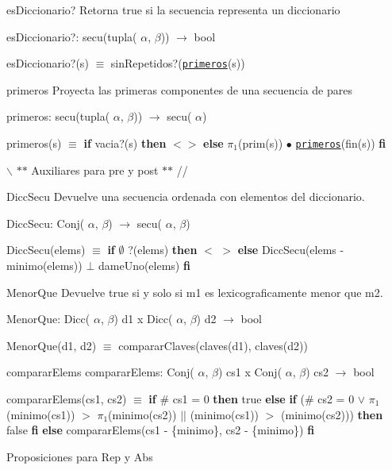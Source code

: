 \begin{DoxyParagraph}{es\-Diccionario?}
\-Retorna true si la secuencia representa un diccionario
\end{DoxyParagraph}
es\-Diccionario?\-: secu(tupla( $\alpha$, $\beta$)) $\to$ bool\par
 es\-Diccionario?(s) $\equiv$ sin\-Repetidos?(\href{axiomas.html#primeros}{\tt primeros}(s)) 

\begin{DoxyParagraph}{primeros}
\-Proyecta las primeras componentes de una secuencia de pares
\end{DoxyParagraph}
primeros\-: secu(tupla( $\alpha$, $\beta$)) $\to$ secu( $\alpha$)\par
 primeros(s) $\equiv$ {\bfseries if} vacia?(s) {\bfseries then} $<$$>$ {\bfseries else} $\pi_1$(prim(s)) $\bullet$ \href{axiomas.html#primeros}{\tt primeros}(fin(s)) {\bfseries fi} 

$\backslash$ $\ast$$\ast$ \-Auxiliares para pre y post $\ast$$\ast$ // \begin{DoxyParagraph}{\-Dicc\-Secu}
\-Devuelve una secuencia ordenada con elementos del diccionario.
\end{DoxyParagraph}
\-Dicc\-Secu\-: \-Conj( $\alpha$, $\beta$) $\to$ secu( $\alpha$, $\beta$)\par
 \-Dicc\-Secu(elems) $\equiv$ {\bfseries if} $\emptyset$ ?(elems) {\bfseries then} $<$ $>$ {\bfseries else} \-Dicc\-Secu(elems -\/ minimo(elems)) $\bot$ dame\-Uno(elems) {\bfseries fi} 

\begin{DoxyParagraph}{\-Menor\-Que}
\-Devuelve true si y solo si m1 es lexicograficamente menor que m2.
\end{DoxyParagraph}
\-Menor\-Que\-: \-Dicc( $\alpha$, $\beta$) d1 x \-Dicc( $\alpha$, $\beta$) d2 $\to$ bool\par
 \-Menor\-Que(d1, d2) $\equiv$ comparar\-Claves(claves(d1), claves(d2)) 

\begin{DoxyParagraph}{comparar\-Elems}
comparar\-Elems\-: \-Conj( $\alpha$, $\beta$) cs1 x \-Conj( $\alpha$, $\beta$) cs2 $\to$ bool\par
 comparar\-Elems(cs1, cs2) $\equiv$ {\bfseries if} \# cs1 = 0 {\bfseries then} true {\bfseries else} {\bfseries if} (\# cs2 = 0 $\lor$ $\pi_1$(minimo(cs1)) $>$ $\pi_1$(minimo(cs2)) $|$$|$ (minimo(cs1)) $>$ (minimo(cs2))) {\bfseries then} false {\bfseries fi} {\bfseries else} comparar\-Elems(cs1 -\/ \{minimo\}, cs2 -\/ \{minimo\}) {\bfseries fi} 
\end{DoxyParagraph}
\-Proposiciones para \-Rep y \-Abs

